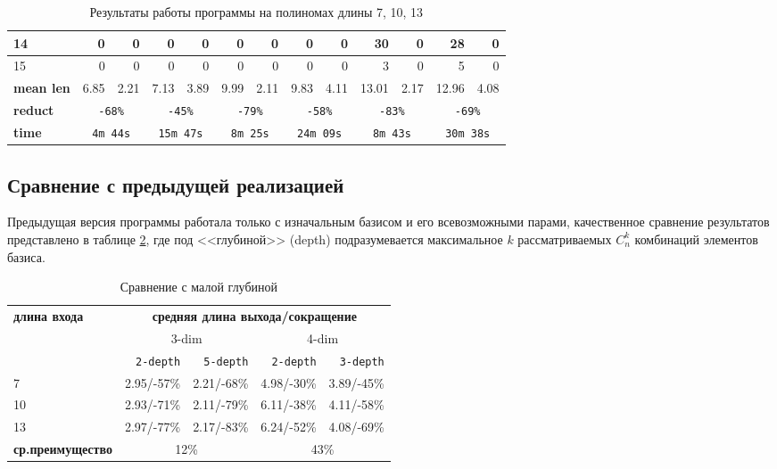 \documentclass[a4paper,12pt,titlepage]{article}
\begin{document}
\begin{table}[h!]
\begin{tabular}{ |l||r|r||r|r||r|r||r|r||r|r||r|r| }
14  & 0     & 0     & 0     & 0     & 0     & 0     & 0     & 0     & 30    & 0     & 28    & 0     \\ \hline
15  & 0     & 0     & 0     & 0     & 0     & 0     & 0     & 0     & 3     & 0     & 5     & 0     \\ \hline \hline
\textbf{mean len}   & 6.85  & 2.21  & 7.13  & 3.89  & 9.99  & 2.11  & 9.83  & 4.11  & 13.01 & 2.17  & 12.96 & 4.08  \\ \hline
\textbf{reduct}  & \multicolumn{2}{c||}{\tt -68\%}  & \multicolumn{2}{c||}{\tt -45\%} & \multicolumn{2}{c||}{\tt -79\%}  & \multicolumn{2}{c||}{\tt -58\%}   & \multicolumn{2}{c||}{\tt -83\%}  & \multicolumn{2}{c|}{\tt -69\%} \\ \hline
\textbf{time}       & \multicolumn{2}{c||}{\tt 4m 44s}  & \multicolumn{2}{c||}{\tt 15m 47s} & \multicolumn{2}{c||}{\tt 8m 25s}  & \multicolumn{2}{c||}{\tt 24m 09s}  & \multicolumn{2}{c||}{\tt 8m 43s}  & \multicolumn{2}{c|}{\tt 30m 38s}  \\ \hline
\end{tabular}
\caption{Результаты работы программы на полиномах длины 7, 10, 13}
\label{table_results}
\end{table}

\subsection{Сравнение с предыдущей реализацией}

Предыдущая версия программы работала только с изначальным базисом и его всевозможными парами, качественное сравнение результатов представлено в таблице \ref{table_comparison}, где под <<глубиной>> (depth) подразумевается максимальное $ k $ рассматриваемых $ C_n^k $ комбинаций элементов базиса.

\begin{table}[h!]
\centering
\begin{tabular}{ |l||r|r||r|r|} \hline
\multirow{3}{*}{\bf длина входа} & \multicolumn{4}{c|}{\bf средняя длина выхода/сокращение} \\ \cline{2-5}
    & \multicolumn{2}{c||}{3-dim} & \multicolumn{2}{c|}{4-dim} \\ \cline{2-5}
    & \texttt{2-depth} & \texttt{5-depth} & \texttt{2-depth} & \texttt{3-depth} \\ \hline \hline
7   & 2.95/-57\%  & 2.21/-68\%  & 4.98/-30\%  & 3.89/-45\%  \\ \hline
10  & 2.93/-71\%  & 2.11/-79\%  & 6.11/-38\%  & 4.11/-58\%  \\ \hline
13  & 2.97/-77\%  & 2.17/-83\%  & 6.24/-52\%  & 4.08/-69\%  \\ \hline \hline
\textbf{ср.преимущество}    & \multicolumn{2}{c||}{12\%}  & \multicolumn{2}{c|}{43\%}   \\ \hline
\end{tabular}
\caption{Сравнение с малой глубиной}
\label{table_comparison}
\end{table}
\end{document}
